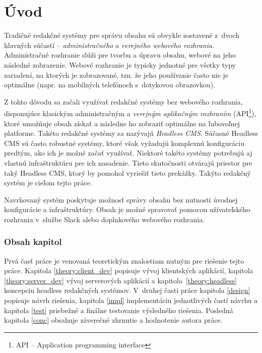 \chapter{Úvod}
Tradičné redakčné systémy pre správu obsahu sú obvykle zostavené z~dvoch hlavných súčastí -- \emph{administračného} a \emph{verejného webového rozhrania}. Administračné rozhranie slúži pre tvorbu a úpravu obsahu, webové na jeho následné zobrazenie. Webové rozhranie je typicky jednotné pre všetky typy zariadení, na ktorých je zobrazované, tzn. že jeho používanie často nie je optimálne (napr. na mobilných telefónoch s~dotykovou obrazovkou).

Z tohto dôvodu sa začali využívať redakčné systémy bez webového rozhrania, disponujúce klasickým administračným a \emph{verejným aplikačným rozhraním} (API\footnote{API -- Application programming interface}), ktoré umožňuje obsah získať a následne ho zobraziť optimálne na ľubovoľnej platforme. Takéto redakčné systémy sa nazývajú \emph{Headless CMS}. Súčasné Headless CMS sú často robustné systémy, ktoré však vyžadujú komplexnú konfiguráciu predtým, ako ich je možné začať využívať. Niektoré takéto systémy potrebujú aj vlastnú infraštruktúru pre ich nasadenie. Tieto skutočnosti otvárajú priestor pre taký Headless CMS, ktorý by pomohol vyriešiť tieto prekážky. Takýto redakčný systém je cieľom tejto práce.

Navrhovaný systém poskytuje možnosť správy obsahu bez nutnosti úvodnej konfigurácie a infraštruktúry. Obsah je možné spravovať pomocou užívateľského rozhrania v~službe Slack alebo doplnkového webového rozhrania.

\subsection*{Obsah kapitol}
Prvá časť práce je venovaná teoretickým znalostiam nutným pre riešenie tejto práce. Kapitola \ref{theory:client_dev} popisuje vývoj klientských aplikácií, kapitola \ref{theory:server_dev} vývoj serverových aplikácií a kapitola~\ref{theory:headless} koncepciu headless redakčných systémov. V~druhej časti práce kapitola \ref{design} popisuje návrh riešenia, kapitola \ref{impl} implementáciu jednotlivých častí návrhu a kapitola \ref{test} priebežné a finálne testovanie výsledného riešenia. Posledná kapitola \ref{conc} obsahuje záverečné zhrnutie a hodnotenie autora práce.

